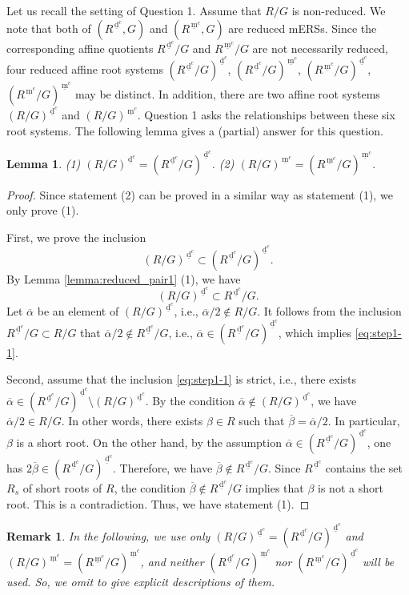 \documentclass[11pt]{amsart}
\newcommand{\dc}{\,\underline{\mathrm{d}}^c}
\newcommand{\mc}{\, \underline{\mathrm{m}}^c}
\newtheorem{lemma}[thm]{Lemma}%
\newtheorem{rem}[thm]{Remark}%
\begin{document}
{Let us recall the setting of Question 1. Assume that $R/G$ is non-reduced.
We note that both of $(R^{\dc},G)$ and $(R^{\mc},G)$ are reduced mERSs. Since the 
corresponding affine quotients $R^{\dc}/G$ and $R^{\mc}/G$ are not necessarily 
reduced, four reduced affine root systems $(R^{\dc}/G)^{\dc}$, $(R^{\dc}/G)^{\mc}$, 
$(R^{\mc}/G)^{\dc}$, $(R^{\mc}/G)^{\mc}$
may be distinct. In addition, there are two affine 
root systems $(R/G)^{\dc}$ and $(R/G)^{\mc}$. Question 1 asks 
the relationships between these
six root systems. The following lemma gives a (partial) answer for this question. 

\begin{lemma}\label{lemma:reduced_pair2}
{\rm (1)} $(R/G)^{\dc}=(R^{\dc}/G)^{\dc}$.
\vskip 1mm
\noindent
{\rm (2)} $(R/G)^{\mc}=(R^{\mc}/G)^{\mc}$.
\end{lemma}

\begin{proof}
Since  statement (2)  can be proved in a similar way as statement (1), we only prove (1).

First, we prove the inclusion
\begin{equation}\label{eq:step1-1}
(R/G)^{\dc}\subset (R^{\dc}/G)^{\dc}.
\end{equation}
By Lemma \ref{lemma:reduced_pair1} (1), we have
\[(R/G)^{\dc}\subset R^{\dc}/G.\]
Let $\overline{\alpha}$ be an element of $(R/G)^{\dc}$, i.e., $\overline{\alpha}/2 \not\in R/G$.
It follows from the inclusion $R^{\dc}/G \subset R/G$ that $\overline{\alpha}/2 \not\in R^{\dc}/G$, 
i.e., $\overline{\alpha} \in (R^{\dc}/G)^{\dc}$, which implies \eqref{eq:step1-1}.

Second, 
assume that the inclusion \eqref{eq:step1-1} is strict, i.e., there exists $\overline{\alpha}\in (R^{\dc}/G)^{\dc}\setminus (R/G)^{\dc}$. 
By the condition $\overline{\alpha}\not\in (R/G)^{\dc}$, we have 
$\overline{\alpha}/2\in R/G$. 
In other words, there exists $\beta\in R$ such that 
$\overline{\beta}=\overline{\alpha}/2$. 
In particular, $\beta$ is a short root. 
On the other hand, by the assumption $\overline{\alpha}\in (R^{\dc}/G)^{\dc}$, 
one has $2\overline{\beta}\in (R^{\dc}/G)^{\dc}$. Therefore, we have 
$\overline{\beta}\not\in R^{\dc}/G$. Since $R^{\dc}$ contains the set $R_s$ of short roots 
of $R$, the condition $\overline{\beta}\not\in R^{\dc}/G$  
implies that $\beta$ is not 
a short root. This is a contradiction. Thus, we have statement (1).
\end{proof}

\begin{rem}
In the following, we use only $(R/G)^{\dc}=(R^{\dc}/G)^{\dc}$ and $(R/G)^{\mc}=(R^{\mc}/G)^{\mc}$, and
neither $(R^{\dc}/G)^{\mc}$ nor $(R^{\mc}/G)^{\dc}$ will be used. So, we omit to give explicit descriptions
of them.
\end{rem}
\vskip 5mm
}
\end{document}
